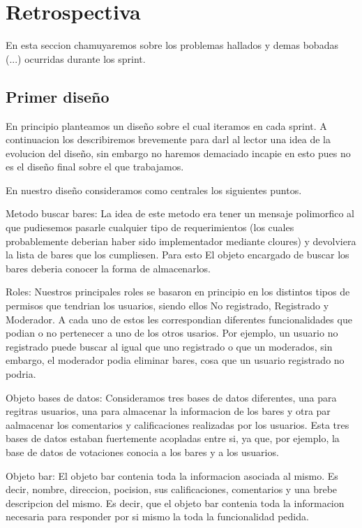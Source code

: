 \section{Retrospectiva}
En esta seccion chamuyaremos sobre los problemas hallados y demas bobadas (...) ocurridas durante los sprint.

\subsection{Primer diseño}

En principio planteamos un diseño sobre el cual iteramos en cada sprint. A continuacion los describiremos brevemente para darl al lector una idea de la evolucion del diseño, sin embargo
no haremos demaciado incapie en esto pues no es el diseño final sobre el que trabajamos.

En nuestro diseño consideramos como centrales los siguientes puntos. 

Metodo buscar bares: La idea de este metodo era tener un mensaje polimorfico al que pudiesemos pasarle cualquier tipo de
requerimientos (los cuales probablemente deberian haber sido implementador mediante cloures) y devolviera la lista de bares que los cumpliesen. Para esto El objeto encargado 
de buscar los bares deberia conocer la forma de almacenarlos.

Roles: Nuestros principales roles se basaron en principio en los distintos tipos de permisos que tendrian los usuarios, siendo ellos No registrado, Registrado y Moderador. A cada 
uno de estos les correspondian diferentes funcionalidades que podian o no pertenecer a uno de los otros usarios. Por ejemplo, un usuario no registrado puede buscar al igual que uno registrado
o que un moderados, sin embargo, el moderador podia eliminar bares, cosa que un usuario registrado no podria.

Objeto bases de datos: Consideramos tres bases de datos diferentes, una para regitras usuarios, una para almacenar la informacion de los bares y otra par aalmacenar los comentarios y calificaciones
realizadas por los usuarios. Esta tres bases de datos estaban fuertemente acopladas entre si, ya que, por ejemplo, la base de datos de votaciones conocia a los bares y a los usuarios.

Objeto bar: El objeto bar contenia toda la informacion asociada al mismo. Es decir, nombre, direccion, pocision, sus calificaciones, comentarios y una brebe descripcion del mismo. Es 
decir, que el objeto bar contenia toda la informacion necesaria para responder por si mismo la toda la funcionalidad pedida. 

